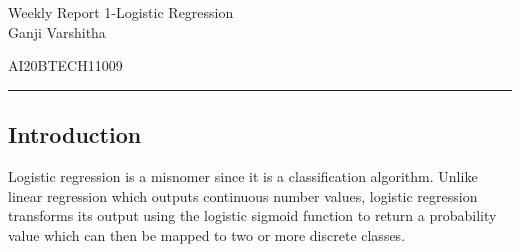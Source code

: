 \documentclass[12pt,letterpaper, onecolumn]{exam}
\begin{document}
\newtheorem{theorem}{Theorem}[section]
\newtheorem{problem}{Problem}
\newtheorem{proposition}{Proposition}[section]
\newtheorem{lemma}{Lemma}[section]
\newtheorem{corollary}[theorem]{Corollary}
\newtheorem{example}{Example}[section]
\newtheorem{definition}[problem]{Definition}

\newcommand{\BEQA}{\begin{eqnarray}}
\newcommand{\EEQA}{\end{eqnarray}}
\newcommand{\define}{\stackrel{\triangle}{=}}

\raggedbottom
\setlength{\parindent}{0pt}
\providecommand{\mbf}{\mathbf}
\providecommand{\norm}[1]{\lVert#1\rVert}
\providecommand{\pr}[1]{\ensuremath{\Pr\left(#1\right)}}
\providecommand{\qfunc}[1]{\ensuremath{Q\left(#1\right)}}
\providecommand{\sbrak}[1]{\ensuremath{{}\left[#1\right]}}
\providecommand{\lsbrak}[1]{\ensuremath{{}\left[#1\right.}}
\providecommand{\rsbrak}[1]{\ensuremath{{}\left.#1\right]}}
\providecommand{\brak}[1]{\ensuremath{\left(#1\right)}}
\providecommand{\lbrak}[1]{\ensuremath{\left(#1\right.}}
\providecommand{\rbrak}[1]{\ensuremath{\left.#1\right)}}
\providecommand{\cbrak}[1]{\ensuremath{\left\{#1\right\}}}
\providecommand{\lcbrak}[1]{\ensuremath{\left\{#1\right.}}
\providecommand{\rcbrak}[1]{\ensuremath{\left.#1\right\}}}
\let\vec\mathbf




\begingroup  
    \centering
    
    \LARGE Weekly Report 1-Logistic Regression\\[0.5em]
    
    \large Ganji Varshitha\par
    \large AI20BTECH11009\par
\endgroup
\rule{\textwidth}{0.4pt}
\pointsdroppedatright   %
\printanswers
\newcommand\Solution{
  \textbf{Solution:}\hspace{3mm}}
\newcommand{\myvec}[1]{\ensuremath{\begin{bmatrix}#1\end{bmatrix}}}

\subsection*{Introduction}
Logistic regression is a misnomer since it is a classification algorithm. Unlike linear regression which outputs continuous number values, logistic regression transforms its output using the logistic sigmoid function to return a probability value which can then be mapped to two or more discrete classes.
\end{document}
